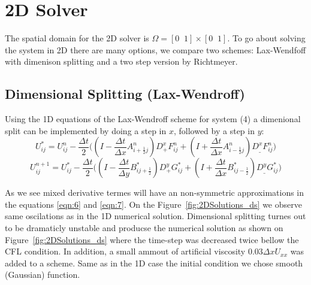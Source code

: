 
\section{2D Solver}
The spatial domain for the 2D solver is $\Omega=[0\;\;1]\times[0\;\;1]$. To go about solving the system in 2D there are many options,
we compare two schemes: Lax-Wendfoff with dimenison splitting and a two step version by Richtmeyer. \newline

\subsection{Dimensional Splitting (Lax-Wendroff)}

Using the 1D equations of the Lax-Wendroff scheme for system (4) a dimenional split can be implemented by 
doing a step in $x$, followed by a step in $y$: 
\begin{equation}\label{eqn:6}
U_{ij}^* = U_{ij}^n - \frac{\Delta t}{2} 
\bigg(( I- \frac{\Delta t}{\Delta x} A_{i+\frac{1}{2}j}^n ) D_+^xF_{ij}^n 
+ (I+ \frac{\Delta t}{\Delta x} A_{i-\frac{1}{2}j}^n) D_{\_}^xF_{ij}^n\bigg)
\end{equation}
\begin{equation}\label{eqn:7}
U_{ij}^{n+1} = U_{ij}^* - 
\frac{\Delta t}{2} \bigg((I - \frac{\Delta t}{\Delta y} B_{ij+\frac{1}{2}}^*) D_+^yG_{ij}^*
 +(I + \frac{\Delta t}{\Delta x} B_{ij-\frac{1}{2}}^*) D_{\_}^y G_{ij}^* \bigg)
\end{equation}

As we see mixed derivative termes will have an non-symmetric approximations in the equations \eqref{eqn:6} and \eqref{eqn:7}. On the Figure~\ref{fig:2DSolutions_ds} 
we observe same oscilations as in the 1D numerical solution.
Dimensional splitting turnes out to be dramaticly unstable and producse the numerical solution as shown on Figure~\ref{fig:2DSolutions_ds} where the time-step was decreased
twice bellow the CFL condition. In addition, a small ammout of artificial viscosity $0.03 \Delta x U_{xx}$ was added to a scheme. Same as in the 1D case the initial condition
we chose smooth (Gaussian) function. 

